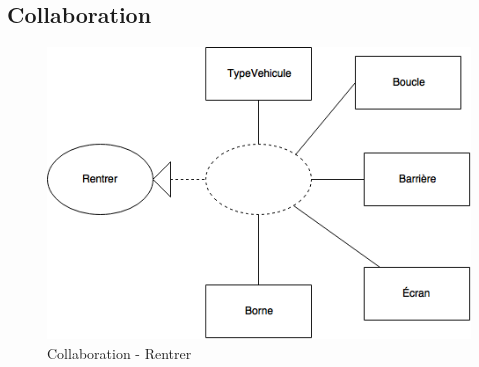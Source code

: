\subsection{Collaboration}
\begin{figure}[!htb]
    \centering
    \includegraphics[scale=0.6]{02_Desenvolvimento/TD2/images/ColaRentrer.png}
    \caption{Collaboration - Rentrer}
    \label{fig:DARentrer}
\end{figure}